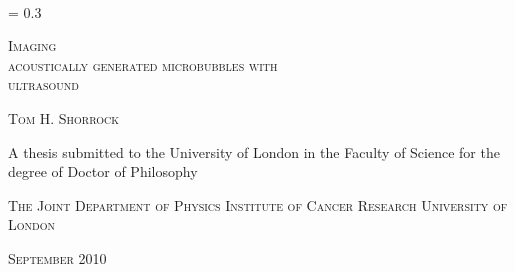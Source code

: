 


\newcommand*{\titleEI}{\begingroup%
\FSfont{5gl}%
\drop = 0.3\textheight
\vspace*{\drop}
\raggedright
{\LARGE {\huge C}ONUNDRUMS \textit{and} \\
\hspace*{30pt} {\huge E}NIGMAS\par}
\vspace{2\baselineskip}
{\large\ltseries\hspace*{15pt} {\LARGE T}WENTY {\LARGE Y}EARS \\[.1\baselineskip]
\hspace*{15pt} OF {\LARGE P}UZZLEMENTS}\par
\vspace{2\baselineskip}
\hspace*{15pt}{\ltseries \textit{\large {\footnotesize BY} The Author}}\par
\vfill
The Publisher {\footnotesize YEAR}
\endgroup}


\thispagestyle{empty}

\mbox{  }
\begin{center}
\drop = 0.3\textheight
\vspace*{\drop}
\vspace{10mm}
\LARGE
\raggedright
{\textsc{\hspace*{222pt}Imaging \\acoustically  generated microbubbles  {\large{with}}\\ \hspace*{195pt}ultrasound}}

\vspace{10mm}
\large
{\textsc{\hspace*{180pt}Tom H. Shorrock}}

\vspace{25mm}\vfill
\large
\hspace*{14pt}A thesis submitted to the University of London in the \linebreak
Faculty of Science for the degree of Doctor of Philosophy \linebreak
\vspace{20mm}\vfill


\vspace{2mm}
\large
{\textsc{\hspace*{85pt}The Joint Department of Physics  \linebreak
\hspace*{104pt}Institute of Cancer Research \linebreak
\hspace*{152pt}University of London
}}

\vspace{2mm}

\large
{\textsc{\hspace*{187pt}September 2010}}

\end{center}

